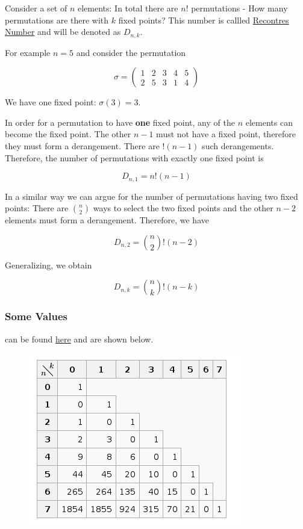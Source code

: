 
Consider a set of \(n\) elements: In total there are \(n!\) permutations - How many permutations are there with \(k\) fixed points? This number is callled
\href{https://en.wikipedia.org/wiki/Rencontres_numbers}{Recontres
Number} and will be denoted as \(D_{n,k}\).

For example \(n=5\) and consider the permutation

\[
\sigma=\begin{pmatrix}
1 & 2 & 3 & 4 & 5 \\
2 & 5 & 3 & 1 & 4
\end{pmatrix}
\]

We have one fixed point: \(\sigma(3) = 3\).

In order for a permutation to have \textbf{one} fixed point, any of the \(n\) elements can become the fixed point. The other \(n-1\) must not have a fixed point, therefore they must form a derangement. There are \(!(n-1)\) such derangements. Therefore, the number of permutations with exactly one fixed point is

\[
D_{n,1} = n !(n-1)
\]

In a similar way we can argue for the number of permutations having two fixed points: There are \(n \choose 2\) ways to select the two fixed points and the other \(n-2\) elements must form a derangement.
Therefore, we have

\[
D_{n,2} = {n \choose 2} !(n-2)
\]

Generalizing, we obtain

\[
D_{n,k} = {n \choose k} !(n-k)
\]

\subsubsection{Some Values}

can be found
\href{https://en.wikipedia.org/wiki/Rencontres_numbers}{here} and are
shown below.

\begin{figure}
\includegraphics{images/recontres_numbers.png}
\end{figure}

